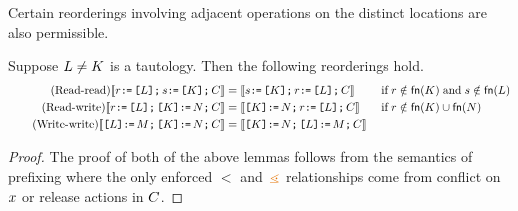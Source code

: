 Certain reorderings involving adjacent operations on the distinct locations
are also permissible. 

\begin{lemma}%
  Suppose $\cExp\neq\dExp$ is a tautology.  Then the following reorderings hold.
  \begin{align*}
    \tag{Read-read}
    \sem{\aReg \GETS \REF{\cExp} \SEMI \bReg \GETS \REF{\dExp} \SEMI \aCmd} &=
    \sem{\bReg \GETS \REF{\dExp} \SEMI \aReg \GETS \REF{\cExp} \SEMI \aCmd}
    &&\textif \aReg\notin\free(\dExp) \textand \bReg\notin\free(\cExp)
    \\
    \tag{Read-write}
    \sem{\aReg \GETS \REF{\cExp} \SEMI \REF{\dExp} \GETS \bExp \SEMI \aCmd} &=
    \sem{\REF{\dExp} \GETS \bExp \SEMI \aReg \GETS \REF{\cExp} \SEMI \aCmd}
    &&\textif \aReg\notin\free(\dExp) \cup\free(\bExp)
    \\
    \tag{Write-write}
    \sem{\REF{\cExp} \GETS \aExp \SEMI \REF{\dExp} \GETS \bExp \SEMI \aCmd} &=
    \sem{\REF{\dExp} \GETS \bExp \SEMI \REF{\cExp} \GETS \aExp \SEMI \aCmd}
  \end{align*}
\begin{proof}
The proof of both of the above lemmas follows from the semantics of prefixing where the only enforced $\lt$ and $\gtN$ relationships come from conflict on $\aLoc$ or release actions in $\aCmd$.
\end{proof}
\end{lemma}

